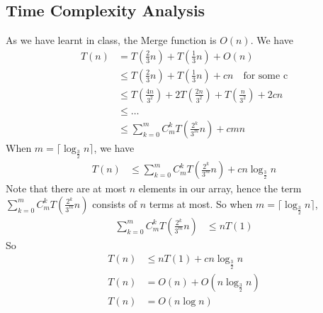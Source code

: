 \documentclass[12pt,letterpaper]{article}
\begin{document}
\subsection{Time Complexity Analysis}
As we have learnt in class, the Merge function is $O(n)$. We have
\begin{align}
    T(n)&=T(\frac{2}{3}n)+T(\frac{1}{3}n)+O(n)\\
    &\leq T(\frac{2}{3}n)+T(\frac{1}{3}n)+cn\quad \text{for some c}\\
    &\leq T(\frac{4n}{3^2})+2T(\frac{2n}{3^2})+T(\frac{n}{3^2})+2cn\\
    &\leq\dots\\
    &\leq \sum_{k=0}^m C_{m}^{k}T(\frac{2^k}{3^m}n)+cmn
\end{align}
When $m=\lceil\log_{\frac{3}{2}}n\rceil$, we have 
\begin{align}
    T(n)&\leq \sum_{k=0}^m C_{m}^{k}T(\frac{2^k}{3^m}n)+cn\log_{\frac{3}{2}}n
\end{align} 
Note that there are at most $n$ elements in our array, hence the term $\sum_{k=0}^m C_{m}^{k}T(\frac{2^k}{3^m}n)$ consists of $n$ terms at most. So when $m=\lceil\log_{\frac{3}{2}}n\rceil$,
\begin{align}
    \sum_{k=0}^m C_{m}^{k}T(\frac{2^k}{3^m}n)&\leq nT(1)
\end{align}  
So
\begin{align}
    T(n)&\leq nT(1)+cn\log_{\frac{3}{2}}n \\
    T(n)&=O(n)+O(n\log_{\frac{3}{2}}n)\\
    T(n)&=O(n\log n)
\end{align}

\section{}
\end{document}

